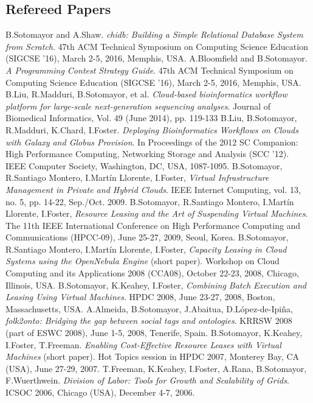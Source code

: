 \documentclass{resume}
\begin{document}
\subsection*{Refereed Papers}
\begin{category}{}
\citembullet B.Sotomayor and A.Shaw. \emph{chidb: Building a Simple Relational Database System from Scratch}. 47th ACM Technical Symposium on Computing Science Education (SIGCSE '16), March 2-5, 2016, Memphis, USA.
\citembullet A.Bloomfield and B.Sotomayor. \emph{A Programming Contest Strategy Guide}. 47th ACM Technical Symposium on Computing Science Education (SIGCSE '16), March 2-5, 2016, Memphis, USA.
\citembullet B.Liu, R.Madduri, B.Sotomayor, et al. \emph{Cloud-based bioinformatics workflow platform for large-scale next-generation sequencing analyses}. Journal of Biomedical Informatics, Vol. 49 (June 2014), pp. 119-133
\citembullet B.Liu, B.Sotomayor, R.Madduri, K.Chard, I.Foster. \emph{Deploying Bioinformatics Workflows on Clouds with Galaxy and Globus Provision}. In Proceedings of the 2012 SC Companion: High Performance Computing, Networking Storage and Analysis (SCC '12). IEEE Computer Society, Washington, DC, USA, 1087-1095.
\citembullet B.Sotomayor, R.Santiago Montero, I.Martín Llorente, I.Foster, \emph{Virtual Infrastructure Management in Private and Hybrid Clouds}. IEEE Internet Computing, vol. 13, no. 5, pp. 14-22, Sep./Oct. 2009.
\citembullet B.Sotomayor, R.Santiago Montero, I.Martín Llorente, I.Foster, \emph{Resource Leasing and the Art of Suspending Virtual Machines}. The 11th IEEE International Conference on High Performance Computing and Communications (HPCC-09), June 25-27, 2009, Seoul, Korea.
\citembullet B.Sotomayor, R.Santiago Montero, I.Martín Llorente, I.Foster, \emph{Capacity Leasing in Cloud Systems using the OpenNebula Engine} (short paper). Workshop on Cloud Computing and its Applications 2008 (CCA08), October 22-23, 2008, Chicago, Illinois, USA.
\citembullet B.Sotomayor, K.Keahey, I.Foster, \emph{Combining Batch Execution and Leasing Using Virtual Machines}. HPDC 2008, June 23-27, 2008, Boston, Massachusetts, USA.
\citembullet A.Almeida, B.Sotomayor, J.Abaitua, D.López-de-Ipiña, \emph{folk2onto: Bridging the gap between social tags and ontologies}. KRRSW 2008 (part of ESWC 2008), June 1-5, 2008, Tenerife, Spain. 
\citembullet B.Sotomayor, K.Keahey, I.Foster, T.Freeman. \emph{Enabling Cost-Effective Resource Leases with Virtual Machines} (short paper). Hot Topics session in HPDC 2007, Monterey Bay, CA (USA), June 27-29, 2007.
\citembullet T.Freeman, K.Keahey, I.Foster, A.Rana, B.Sotomayor, F.Wuerthwein. \emph{Division of Labor: Tools for Growth and Scalability of Grids}. ICSOC 2006, Chicago (USA), December 4-7, 2006.

\end{category}
\end{document}
